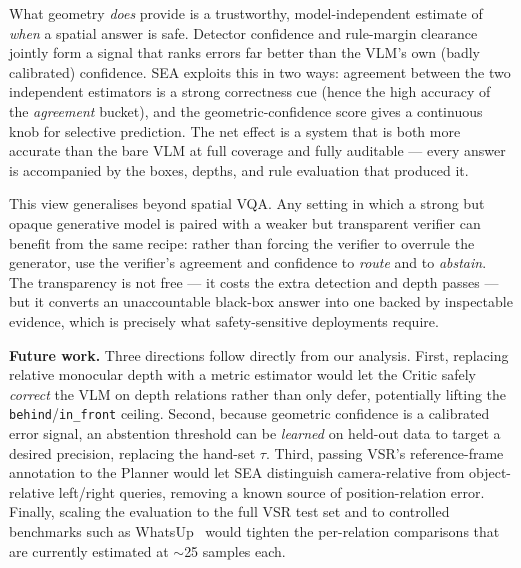 \documentclass[10pt,twocolumn,letterpaper]{article}
\newcommand{\rel}[1]{\texttt{#1}}
\begin{document}
What geometry \emph{does} provide is a trustworthy, model-independent estimate
of \emph{when} a spatial answer is safe. Detector confidence and rule-margin
clearance jointly form a signal that ranks errors far better than the VLM's
own (badly calibrated) confidence. SEA exploits this in two ways: agreement
between the two independent estimators is a strong correctness cue (hence the
high accuracy of the \emph{agreement} bucket), and the geometric-confidence
score gives a continuous knob for selective prediction. The net effect is a
system that is both more accurate than the bare VLM at full coverage and fully
auditable --- every answer is accompanied by the boxes, depths, and rule
evaluation that produced it.

This view generalises beyond spatial VQA. Any setting in which a strong but
opaque generative model is paired with a weaker but transparent verifier can
benefit from the same recipe: rather than forcing the verifier to overrule the
generator, use the verifier's agreement and confidence to \emph{route} and to
\emph{abstain}. The transparency is not free --- it costs the extra detection
and depth passes --- but it converts an unaccountable black-box answer into one
backed by inspectable evidence, which is precisely what safety-sensitive
deployments require.

\textbf{Future work.} Three directions follow directly from our analysis.
First, replacing relative monocular depth with a metric estimator would let the
Critic safely \emph{correct} the VLM on depth relations rather than only defer,
potentially lifting the \rel{behind}/\rel{in\_front} ceiling. Second, because
geometric confidence is a calibrated error signal, an abstention threshold can
be \emph{learned} on held-out data to target a desired precision, replacing the
hand-set $\tau$. Third, passing VSR's reference-frame annotation to the Planner
would let SEA distinguish camera-relative from object-relative left/right
queries, removing a known source of position-relation error. Finally, scaling
the evaluation to the full VSR test set and to controlled benchmarks such as
WhatsUp~\cite{whatsup} would tighten the per-relation comparisons that are
currently estimated at $\sim$25 samples each.
\end{document}

